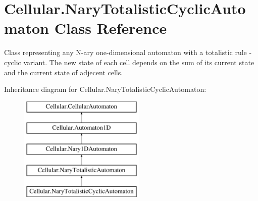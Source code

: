 \hypertarget{class_cellular_1_1_nary_totalistic_cyclic_automaton}{}\section{Cellular.\+Nary\+Totalistic\+Cyclic\+Automaton Class Reference}
\label{class_cellular_1_1_nary_totalistic_cyclic_automaton}


Class representing any N-\/ary one-\/dimensional automaton with a totalistic rule -\/ cyclic variant. The new state of each cell depends on the sum of its current state and the current state of adjecent cells.  


Inheritance diagram for Cellular.\+Nary\+Totalistic\+Cyclic\+Automaton\+:\begin{figure}[H]
\begin{center}
\leavevmode
\includegraphics[height=5.000000cm]{class_cellular_1_1_nary_totalistic_cyclic_automaton}
\end{center}
\end{figure}
